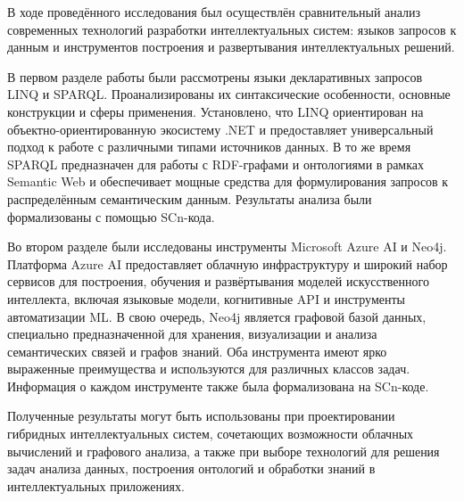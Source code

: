 
В ходе проведённого исследования был осуществлён сравнительный анализ современных технологий разработки интеллектуальных систем: языков запросов к данным и инструментов построения и развертывания интеллектуальных решений.

В первом разделе работы были рассмотрены языки декларативных запросов LINQ и SPARQL. Проанализированы их синтаксические особенности, основные конструкции и сферы применения. Установлено, что LINQ ориентирован на объектно-ориентированную экосистему .NET и предоставляет универсальный подход к работе с различными типами источников данных. В то же время SPARQL предназначен для работы с RDF-графами и онтологиями в рамках Semantic Web и обеспечивает мощные средства для формулирования запросов к распределённым семантическим данным. Результаты анализа были формализованы с помощью SCn-кода.

Во втором разделе были исследованы инструменты Microsoft Azure AI и Neo4j. Платформа Azure AI предоставляет облачную инфраструктуру и широкий набор сервисов для построения, обучения и развёртывания моделей искусственного интеллекта, включая языковые модели, когнитивные API и инструменты автоматизации ML. В свою очередь, Neo4j является графовой базой данных, специально предназначенной для хранения, визуализации и анализа семантических связей и графов знаний. Оба инструмента имеют ярко выраженные преимущества и используются для различных классов задач. Информация о каждом инструменте также была формализована на SCn-коде.

Полученные результаты могут быть использованы при проектировании гибридных интеллектуальных систем, сочетающих возможности облачных вычислений и графового анализа, а также при выборе технологий для решения задач анализа данных, построения онтологий и обработки знаний в интеллектуальных приложениях.

